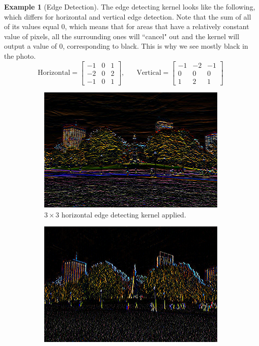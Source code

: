 \documentclass{article}
\theoremstyle{definition}
\newtheorem{example}{Example}[section]
\theoremstyle{remark}
\theoremstyle{definition}
\begin{document}
\begin{example}[Edge Detection]
The edge detecting kernel looks like the following, which differs for horizontal and vertical edge detection. Note that the sum of all of its values equal $0$, which means that for areas that have a relatively constant value of pixels, all the surrounding ones will ``cancel" out and the kernel will output a value of $0$, corresponding to black. This is why we see mostly black in the photo. 
\[\text{Horizontal} = \begin{bmatrix} -1 & 0 & 1 \\ -2 & 0 & 2 \\ -1 & 0 & 1 \end{bmatrix}, \;\;\;\;\;\; \text{Vertical} = \begin{bmatrix} -1 & -2 & -1 \\ 0 & 0 & 0 \\ 1 & 2 & 1 \end{bmatrix}\]
\begin{figure}[hbt!]
    \centering
    \begin{subfigure}[b]{0.45\textwidth}
    \centering
        \includegraphics[width=\textwidth]{Images/OpenCV/Horizontal.png}
        \caption{$3 \times 3$ horizontal edge detecting kernel applied. }
        \label{fig:d}
    \end{subfigure}
    \begin{subfigure}[b]{0.45\textwidth}
    \centering
        \includegraphics[width=\textwidth]{Images/OpenCV/Vertical.png}

\end{subfigure}
\end{figure}
\end{example}
\end{document}
